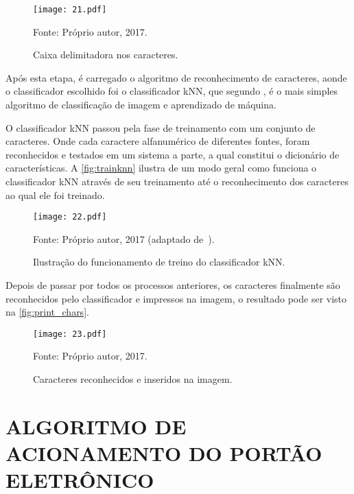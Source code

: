 \begin{figure}[htb]
	\centering
	\caption{{\footnotesize Caixa delimitadora nos caracteres.}}   %
	\label{fig:del_chars}
	\texttt{[image: 21.pdf]}
	
	{\footnotesize Fonte: Próprio autor, 2017.}
\end{figure}

Após esta etapa, é carregado o algoritmo de reconhecimento de caracteres, aonde o classificador escolhido foi o classificador kNN, que segundo , é o mais simples algoritmo de classificação de imagem e aprendizado de máquina.

O classificador kNN passou pela fase de treinamento com um conjunto de caracteres. Onde cada caractere alfanumérico de diferentes fontes, foram reconhecidos e testados em um sistema a parte, a qual constitui o dicionário de características. A \autoref{fig:trainknn} ilustra de um modo geral como funciona o classificador kNN através de seu treinamento até o reconhecimento dos caracteres ao qual ele foi treinado.

\begin{figure}[htb]
	\centering
	\caption{{\footnotesize Ilustração do funcionamento de treino do classificador kNN.}}   %
	\label{fig:trainknn}
	\texttt{[image: 22.pdf]}
	
	{\footnotesize Fonte: Próprio autor, 2017 (adaptado de~).}
\end{figure}

Depois de passar por todos os processos anteriores, os caracteres finalmente são reconhecidos pelo classificador e impressos na imagem, o resultado pode ser visto na \autoref{fig:print_chars}.

\begin{figure}[htb]
	\centering
	\caption{{\footnotesize Caracteres reconhecidos e inseridos na imagem.}}   %
	\label{fig:print_chars}
	\texttt{[image: 23.pdf]}
	
	{\footnotesize Fonte: Próprio autor, 2017.}
\end{figure}

\section{\uppercase{Algoritmo de acionamento do portão eletrônico}}

